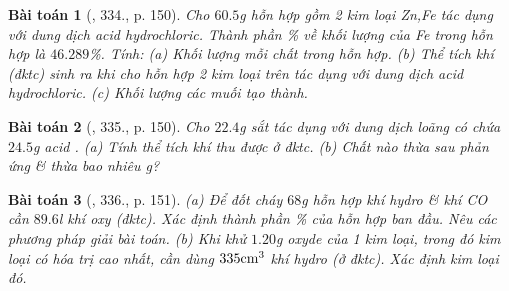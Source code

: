 \documentclass{article}
\newtheorem{baitoan}{Bài toán}
\begin{document}
\begin{baitoan}[\cite{An_400_BT_Hoa_Hoc_8_2020}, 334., p. 150]
	Cho $60.5$\emph{g} hỗn hợp gồm 2 kim loại \emph{Zn,Fe} tác dụng với dung dịch acid hydrochloric. Thành phần \% về khối lượng của \emph{Fe} trong hỗn hợp là $46.289$\%. Tính: (a) Khối lượng mỗi chất trong hỗn hợp. (b) Thể tích khí \emph{} (đktc) sinh ra khi cho hỗn hợp 2 kim loại trên tác dụng với dung dịch acid hydrochloric. (c) Khối lượng các muối tạo thành.
\end{baitoan}

\begin{baitoan}[\cite{An_400_BT_Hoa_Hoc_8_2020}, 335., p. 150]
	Cho $22.4$\emph{g} sắt tác dụng với dung dịch loãng có chứa $24.5$\emph{g} acid \emph{}. (a) Tính thể tích khí \emph{} thu được ở đktc. (b) Chất nào thừa sau phản ứng \& thừa bao nhiêu \emph{g}?	
\end{baitoan}

\begin{baitoan}[\cite{An_400_BT_Hoa_Hoc_8_2020}, 336., p. 151]
	(a) Để đốt cháy $68$\emph{g} hỗn hợp khí hydro \& khí \emph{CO} cần $89.6$\emph{l} khí oxy (đktc). Xác định thành phần \% của hỗn hợp ban đầu. Nêu các phương pháp giải bài toán. (b) Khi khử $1.20$\emph{g} oxyde của 1 kim loại, trong đó kim loại có hóa trị cao nhất, cần dùng $\rm335cm^3$ khí hydro (ở đktc). Xác định kim loại đó.
\end{baitoan}


\printbibliography[heading=bibintoc]
	
\end{document}
